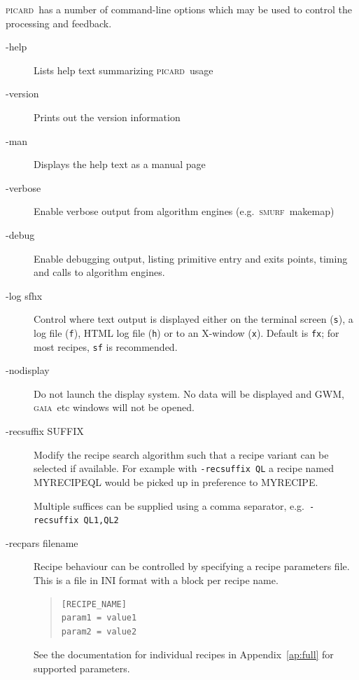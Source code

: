 \documentclass[twoside,11pt]{article}
\renewcommand{\_}{\texttt{\symbol{95}}}
\newenvironment{myquote}{\begin{quote}\begin{small}}{\end{small}\end{quote}}
\newcommand{\GAIA}{\textsc{gaia}}
\newcommand{\SMURF}{\textsc{smurf}}
\newcommand{\picard}{\textsc{picard}}
\newcommand{\task}[1]{\textsf{#1}}
\begin{document}
\picard\ has a number of command-line options which may be used to
control the processing and feedback.

\begin{description}
\item[-help] \mbox{}

  Lists help text summarizing \picard\ usage

\item[-version] \mbox{}

  Prints out the version information

\item[-man] \mbox{}

  Displays the help text as a manual page

\item[-verbose] \mbox{}

  Enable verbose output from algorithm engines (e.g.\ \SMURF\ \task{makemap})

\item[-debug] \mbox{}

  Enable debugging output, listing primitive entry and exits points,
  timing and calls to algorithm engines.

\item[-log sfhx] \mbox{}

  Control where text output is displayed either on the terminal screen
  (\texttt{s}), a log file (\texttt{f}), HTML log file (\texttt{h}) or
  to an X-window (\texttt{x}). Default is \texttt{fx}; for most
  recipes, \texttt{sf} is recommended.

\item[-nodisplay] \mbox{}

  Do not launch the display system. No data will be displayed and GWM,
  \GAIA\ etc windows will not be opened.

\item[-recsuffix SUFFIX] \mbox{}

  Modify the recipe search algorithm such that a recipe variant can be
  selected if available. For example with \texttt{-recsuffix QL} a
  recipe named \task{MYRECIPE\_QL} would be picked up in preference to
  \task{MYRECIPE}.

  Multiple suffices can be supplied using a comma separator, e.g.\
  \texttt{-recsuffix QL1,QL2}

\item[-recpars filename] \mbox{}

  Recipe behaviour can be controlled by specifying a recipe parameters
  file. This is a file in INI format with a block per recipe name.
\begin{myquote}
\begin{verbatim}
[RECIPE_NAME]
param1 = value1
param2 = value2
\end{verbatim}
\end{myquote}
See the documentation for individual recipes in Appendix~\ref{ap:full}
for supported parameters.

\end{description}
\end{document}
